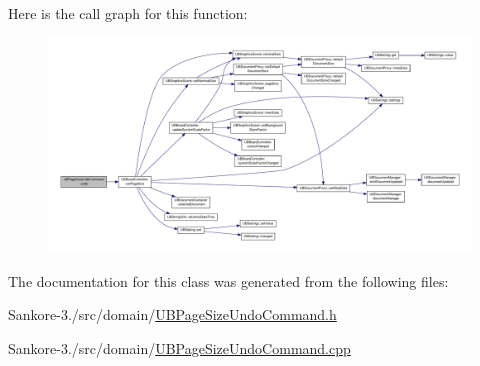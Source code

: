 Here is the call graph for this function\-:
\nopagebreak
\begin{figure}[H]
\begin{center}
\leavevmode
\includegraphics[width=350pt]{df/d58/class_u_b_page_size_undo_command_a94c683dc241bc250649f83de89bdbc7e_cgraph}
\end{center}
\end{figure}




The documentation for this class was generated from the following files\-:\begin{DoxyCompactItemize}
\item 
Sankore-\/3./src/domain/\hyperlink{_u_b_page_size_undo_command_8h}{U\-B\-Page\-Size\-Undo\-Command.\-h}\item 
Sankore-\/3./src/domain/\hyperlink{_u_b_page_size_undo_command_8cpp}{U\-B\-Page\-Size\-Undo\-Command.\-cpp}\end{DoxyCompactItemize}
